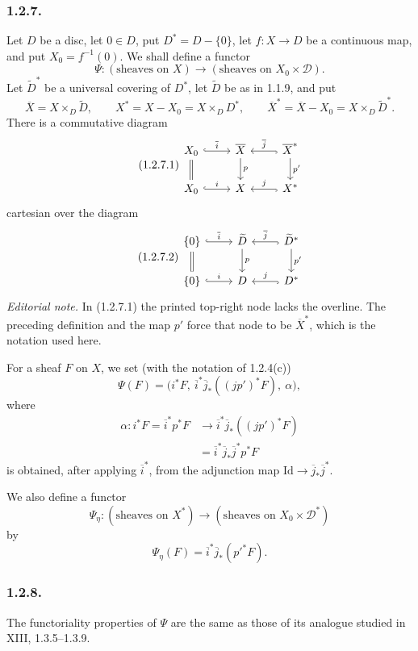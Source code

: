 \subsubsection*{1.2.7.}
Let $D$ be a disc, let $0\in D$, put $D^*=D-\{0\}$, let
$f:X\longrightarrow D$ be a continuous map, and put
$X_0=f^{-1}(0)$.  We shall define a functor
\[
\Psi:(\text{sheaves on }X)
\longrightarrow(\text{sheaves on }X_0\times\mathcal D).
\]
Let $\widetilde D^*$ be a universal covering of $D^*$, let
$\widetilde D$ be as in 1.1.9, and put
\[
\overline X=X\times_D\widetilde D,
\qquad
X^*=X-X_0=X\times_DD^*,
\qquad
\overline X^*=\overline X-X_0=X\times_D\widetilde D^*.
\]
There is a commutative diagram
\begin{equation}\tag{1.2.7.1}
\begin{tikzcd}
X_0 \arrow[r, hook, "\overline i"] \arrow[d, equal]
  & \overline X \arrow[d, "p"]
  & \overline X^* \arrow[l, hook, "\overline j"']
      \arrow[d, "p'"] \\
X_0 \arrow[r, hook, "i"]
  & X
  & X^* \arrow[l, hook, "j"']
\end{tikzcd}
\end{equation}
cartesian over the diagram
\begin{equation}\tag{1.2.7.2}
\begin{tikzcd}
\{0\} \arrow[r, hook, "\overline i"] \arrow[d, equal]
  & \widetilde D \arrow[d, "p"]
  & \widetilde D^* \arrow[l, hook, "\overline j"']
      \arrow[d, "p'"] \\
\{0\} \arrow[r, hook, "i"]
  & D
  & D^* \arrow[l, hook, "j"']
\end{tikzcd}
\end{equation}
\noindent\emph{Editorial note.}  In (1.2.7.1) the printed top-right
node lacks the overline.  The preceding definition and the map $p'$
force that node to be $\overline X^*$, which is the notation used
here.

For a sheaf $F$ on $X$, we set (with the notation of 1.2.4(c))
\[
\Psi(F)=
\bigl(i^*F,\ \overline i^*\overline j_*((jp')^*F),\ \alpha\bigr),
\]
where
\[
\begin{split}
\alpha:i^*F=\overline i^*p^*F
&\longrightarrow
\overline i^*\overline j_*((jp')^*F)\\
&=\overline i^*\overline j_*\overline j^*p^*F
\end{split}
\]
is obtained, after applying $\overline i^*$, from the adjunction map
$\mathrm{Id}\longrightarrow\overline j_*\overline j^*$.

We also define a functor
\[
\Psi_\eta:(\text{sheaves on }X^*)
\longrightarrow(\text{sheaves on }X_0\times\mathcal D^*)
\]
by
\[
\Psi_\eta(F)=\overline i^*\overline j_*({p'}^*F).
\]

\subsubsection*{1.2.8.}
The functoriality properties of $\Psi$ are the same as those of its
analogue studied in XIII, 1.3.5--1.3.9.

